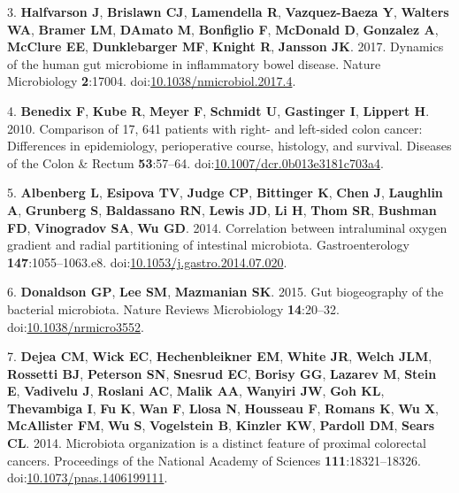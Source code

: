 \documentclass[11pt,]{article}
\begin{document}
\hypertarget{ref-Halfvarson2017}{}
3. \textbf{Halfvarson J}, \textbf{Brislawn CJ}, \textbf{Lamendella R},
\textbf{Vazquez-Baeza Y}, \textbf{Walters WA}, \textbf{Bramer LM},
\textbf{DAmato M}, \textbf{Bonfiglio F}, \textbf{McDonald D},
\textbf{Gonzalez A}, \textbf{McClure EE}, \textbf{Dunklebarger MF},
\textbf{Knight R}, \textbf{Jansson JK}. 2017. Dynamics of the human gut
microbiome in inflammatory bowel disease. Nature Microbiology
\textbf{2}:17004.
doi:\href{https://doi.org/10.1038/nmicrobiol.2017.4}{10.1038/nmicrobiol.2017.4}.

\hypertarget{ref-Benedix2010}{}
4. \textbf{Benedix F}, \textbf{Kube R}, \textbf{Meyer F},
\textbf{Schmidt U}, \textbf{Gastinger I}, \textbf{Lippert H}. 2010.
Comparison of 17, 641 patients with right- and left-sided colon cancer:
Differences in epidemiology, perioperative course, histology, and
survival. Diseases of the Colon \& Rectum \textbf{53}:57--64.
doi:\href{https://doi.org/10.1007/dcr.0b013e3181c703a4}{10.1007/dcr.0b013e3181c703a4}.

\hypertarget{ref-Albenberg2014}{}
5. \textbf{Albenberg L}, \textbf{Esipova TV}, \textbf{Judge CP},
\textbf{Bittinger K}, \textbf{Chen J}, \textbf{Laughlin A},
\textbf{Grunberg S}, \textbf{Baldassano RN}, \textbf{Lewis JD},
\textbf{Li H}, \textbf{Thom SR}, \textbf{Bushman FD}, \textbf{Vinogradov
SA}, \textbf{Wu GD}. 2014. Correlation between intraluminal oxygen
gradient and radial partitioning of intestinal microbiota.
Gastroenterology \textbf{147}:1055--1063.e8.
doi:\href{https://doi.org/10.1053/j.gastro.2014.07.020}{10.1053/j.gastro.2014.07.020}.

\hypertarget{ref-Donaldson2015}{}
6. \textbf{Donaldson GP}, \textbf{Lee SM}, \textbf{Mazmanian SK}. 2015.
Gut biogeography of the bacterial microbiota. Nature Reviews
Microbiology \textbf{14}:20--32.
doi:\href{https://doi.org/10.1038/nrmicro3552}{10.1038/nrmicro3552}.

\hypertarget{ref-Dejea2014}{}
7. \textbf{Dejea CM}, \textbf{Wick EC}, \textbf{Hechenbleikner EM},
\textbf{White JR}, \textbf{Welch JLM}, \textbf{Rossetti BJ},
\textbf{Peterson SN}, \textbf{Snesrud EC}, \textbf{Borisy GG},
\textbf{Lazarev M}, \textbf{Stein E}, \textbf{Vadivelu J},
\textbf{Roslani AC}, \textbf{Malik AA}, \textbf{Wanyiri JW}, \textbf{Goh
KL}, \textbf{Thevambiga I}, \textbf{Fu K}, \textbf{Wan F}, \textbf{Llosa
N}, \textbf{Housseau F}, \textbf{Romans K}, \textbf{Wu X},
\textbf{McAllister FM}, \textbf{Wu S}, \textbf{Vogelstein B},
\textbf{Kinzler KW}, \textbf{Pardoll DM}, \textbf{Sears CL}. 2014.
Microbiota organization is a distinct feature of proximal colorectal
cancers. Proceedings of the National Academy of Sciences
\textbf{111}:18321--18326.
doi:\href{https://doi.org/10.1073/pnas.1406199111}{10.1073/pnas.1406199111}.
\end{document}
